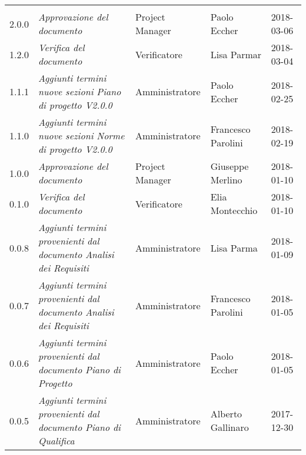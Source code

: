 \newpage 
\section*{}
\begin{table}[H]
	\centering
	\begin{tabular}{p{2cm}|C{4cm}|C{3cm}|R{3cm}|R{2cm}}
		
		  &  & &  & \\
		
		
		2.0.0 & \emph{Approvazione del documento} & Project Manager & Paolo Eccher & 2018-03-06  \\
		\hline
		
		1.2.0 & \emph{Verifica del documento} & Verificatore & Lisa Parmar & 2018-03-04  \\
		\hline
		
		1.1.1 & \emph{Aggiunti termini nuove sezioni Piano di progetto V2.0.0} & Amministratore & Paolo Eccher & 2018-02-25  \\
		\hline
		
		1.1.0 & \emph{Aggiunti termini nuove sezioni Norme di progetto V2.0.0} & Amministratore & Francesco Parolini & 2018-02-19  \\
		\hline
		
		1.0.0 & \emph{Approvazione del documento} & Project Manager & Giuseppe Merlino & 2018-01-10  \\
		\hline
		
		0.1.0 & \emph{Verifica del documento} & Verificatore & Elia Montecchio  & 2018-01-10 \\
		\hline
		
		0.0.8 & \emph{Aggiunti termini provenienti dal documento Analisi dei Requisiti} & Amministratore  & Lisa Parma & 2018-01-09 \\
		\hline
		
		0.0.7 & \emph{Aggiunti termini provenienti dal documento Analisi dei Requisiti} & Amministratore & Francesco Parolini & 2018-01-05 \\
		\hline
		
		0.0.6 & \emph{Aggiunti termini provenienti dal documento Piano di Progetto} & Amministratore & Paolo Eccher & 2018-01-05  \\
		\hline
		
		0.0.5 & \emph{Aggiunti termini provenienti dal documento Piano di Qualifica} & Amministratore & Alberto Gallinaro & 2017-12-30 \\
		\hline
		

\end{tabular}
\end{table}
